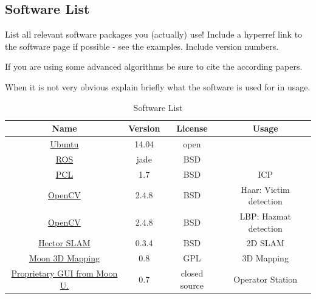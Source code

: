 \documentclass[journal]{IEEEtran}
\begin{document}
\subsection{Software List}
List all relevant software packages you (actually) use!
Include a hyperref link to the software page if possible - see the examples. Include version numbers.

If you are using some advanced algorithms be sure to cite the according papers.

When it is not very obvious explain briefly what the software is used for in usage.

\begin{table}
\renewcommand{\arraystretch}{1}
 \tabcolsep=0.1cm

\caption{Software List}
\label{tab:SoftwareList}
\centering
\begin{tabular}{|c|c|c|c|}
\hline
Name & Version & License & Usage \\
\hline
 \href{http://www.ubuntu.com}{Ubuntu} & 14.04 & open & \\
 \href{http://www.ros.org}{ROS} & jade & BSD & \\
 \href{http://www.pointclouds.org/}{PCL} \cite{Rusu_ICRA2011_PCL}& 1.7 & BSD & ICP \\
 \href{http://opencv.org/}{OpenCV} \cite{990517, 1038171} & 2.4.8 & BSD & Haar: Victim detection \\
 \href{http://opencv.org/}{OpenCV} \cite{Lee2007LBP} & 2.4.8 & BSD & LBP: Hazmat detection \\
 \href{http://wiki.ros.org/hector_slam}{Hector SLAM} \cite{KohlbrecherMeyerStrykKlingaufFlexibleSlamSystem2011} & 0.3.4 & BSD & 2D SLAM \\
 \href{http://robotics.moon.edu}{Moon 3D Mapping} & 0.8 & GPL & 3D Mapping \\
 \href{}{Proprietary GUI from Moon U.} & 0.7 & closed source & Operator Station \\
 
\hline
\end{tabular}
\end{table}


\ifCLASSOPTIONcaptionsoff
  \newpage
\fi



\end{document}
